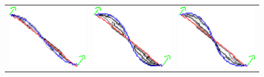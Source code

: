\begin{figure}
\begin{tabular}{ccc}
\includegraphics[scale=0.25]{figures/chapter5/fixed-orientations/elastica/len_pen_0.1/curve-2/summary.pdf} &
\includegraphics[scale=0.25]{figures/chapter5/fixed-orientations/elastica/len_pen_0.01/curve-2/summary.pdf} &
\includegraphics[scale=0.25]{figures/chapter5/fixed-orientations/elastica/len_pen_0.001/curve-2/summary.pdf}\\[2em]

\end{tabular}
\end{figure}
